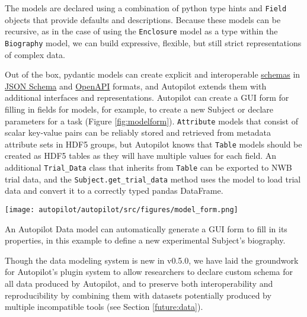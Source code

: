 The models are declared using a combination of python type hints and \texttt{Field} objects that provide defaults and descriptions. Because these models can be recursive, as in the case of using the \texttt{Enclosure} model as a type within the \texttt{Biography} model, we can build expressive, flexible, but still strict representations of complex data. 

Out of the box, pydantic models can create explicit and interoperable \href{https://pydantic-docs.helpmanual.io/usage/schema/}{schemas} in \href{https://json-schema.org/draft/2020-12/json-schema-core.html}{JSON Schema} and \href{https://github.com/OAI/OpenAPI-Specification}{OpenAPI} formats, and Autopilot extends them with additional interfaces and representations. Autopilot can create a GUI form for filling in fields for models, for example, to create a new Subject or declare parameters for a task (Figure \ref{fig:modelform}). \texttt{Attribute} models that consist of scalar key-value pairs can be reliably stored and retrieved from metadata attribute sets in HDF5 groups, but Autopilot knows that \texttt{Table} models should be created as HDF5 tables as they will have multiple values for each field. An additional \texttt{Trial\_Data} class that inherits from \texttt{Table} can be exported to NWB trial data, and the \texttt{Subject.get\_trial\_data} method uses the model to load trial data and convert it to a correctly typed pandas\citep{mckinneyPandasFoundationalPython2011} DataFrame.

\begin{marginfigure}[-3cm]
\texttt{[image: autopilot/autopilot/src/figures/model\_form.png]}
\caption{An Autopilot Data model can automatically generate a GUI form to fill in its properties, in this example to define a new experimental Subject's biography.}
\label{fig:modelform}
\end{marginfigure}

Though the data modeling system is new in v0.5.0, we have laid the groundwork for Autopilot's plugin system to allow researchers to declare custom schema for all data produced by Autopilot, and to preserve both interoperability and reproducibility by combining them with datasets potentially produced by multiple incompatible tools (see Section \ref{future:data}).



